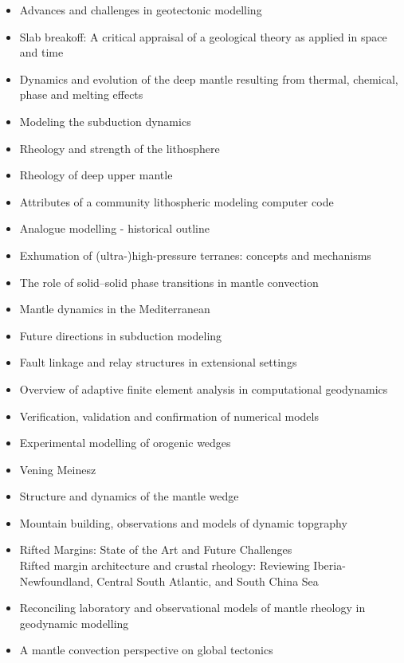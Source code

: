 \begin{itemize}
\item Advances and challenges in geotectonic modelling \cite{bufy14}
\item Slab breakoff: A critical appraisal of a geological theory as applied in space and time \cite{garm18}
\item Dynamics and evolution of the deep mantle resulting from thermal, chemical, phase and melting effects \cite{tack12}
\item Modeling the subduction dynamics \cite{kinc95,bill08}
\item Rheology and strength of the lithosphere \cite{kirb83,buro11}
\item Rheology of deep upper mantle \cite{kara10}
\item Attributes of a community lithospheric modeling computer code \cite{comc15}
\item Analogue modelling - historical outline \cite{koyi97}
\item Exhumation of (ultra-)high-pressure terranes: concepts and mechanisms \cite{warr13}
\item The role of solid–solid phase transitions in mantle convection \cite{fada17}
\item Mantle dynamics in the Mediterranean \cite{faba14}
\item Future directions in subduction modeling \cite{gery11}
\item Fault linkage and relay structures in extensional settings \cite{foro16}
\item Overview of adaptive finite element analysis in computational geodynamics \cite{masm13}
\item Verification, validation and confirmation of numerical models \cite{orsb94}
\item Experimental modelling of orogenic wedges \cite{grmd12}
\item Vening Meinesz \cite{vlaa89}
\item Structure and dynamics of the mantle wedge \cite{vank03}
\item Mountain building, observations and models of dynamic topgraphy \cite{flgm13,fabc13}
\item Rifted Margins: State of the Art and Future Challenges \cite{pema19}\\
      Rifted margin architecture and crustal rheology: Reviewing
Iberia-Newfoundland, Central South Atlantic, and South China Sea \cite{brhc17}
\item  Reconciling laboratory and observational models of mantle rheology in geodynamic modelling \cite{king16}
\item A mantle convection perspective on global tectonics \cite{cogu17}
\end{itemize}

